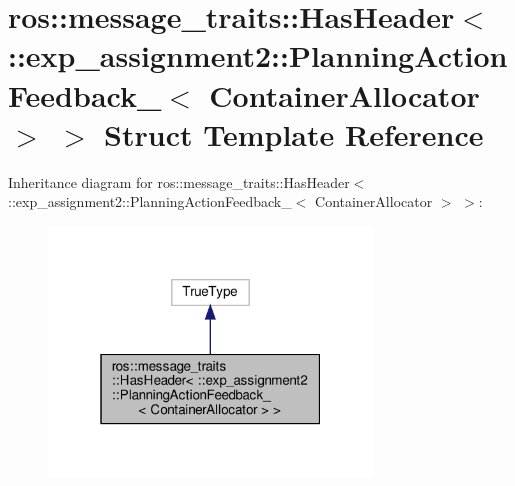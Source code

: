 \hypertarget{structros_1_1message__traits_1_1HasHeader_3_01_1_1exp__assignment2_1_1PlanningActionFeedback___3_01ContainerAllocator_01_4_01_4}{}\section{ros\+:\+:message\+\_\+traits\+:\+:Has\+Header$<$ \+:\+:exp\+\_\+assignment2\+:\+:Planning\+Action\+Feedback\+\_\+$<$ Container\+Allocator $>$ $>$ Struct Template Reference}
\label{structros_1_1message__traits_1_1HasHeader_3_01_1_1exp__assignment2_1_1PlanningActionFeedback___3_01ContainerAllocator_01_4_01_4}


Inheritance diagram for ros\+:\+:message\+\_\+traits\+:\+:Has\+Header$<$ \+:\+:exp\+\_\+assignment2\+:\+:Planning\+Action\+Feedback\+\_\+$<$ Container\+Allocator $>$ $>$\+:
\nopagebreak
\begin{figure}[H]
\begin{center}
\leavevmode
\includegraphics[width=244pt]{structros_1_1message__traits_1_1HasHeader_3_01_1_1exp__assignment2_1_1PlanningActionFeedback___3438873749c546b092c94c75d6e540d18}
\end{center}
\end{figure}



